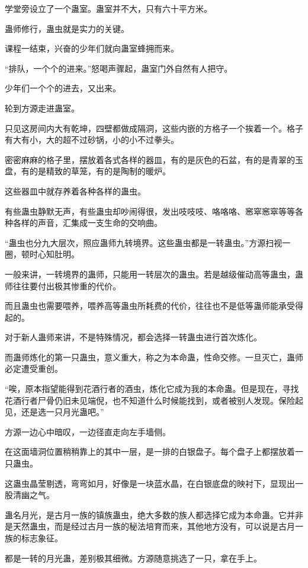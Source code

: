 
\begin{this_body}

学堂旁设立了一个蛊室。蛊室并不大，只有六十平方米。

蛊师修行，蛊虫就是实力的关键。

课程一结束，兴奋的少年们就向蛊室蜂拥而来。

“排队，一个个的进来。”怒喝声骤起，蛊室门外自然有人把守。

少年们一个个的进去，又出来。

轮到方源走进蛊室。

只见这房间内大有乾坤，四壁都做成隔洞，这些内嵌的方格子一个挨着一个。格子有大有小，大的超不过砂锅，小的小不过拳头。

密密麻麻的格子里，摆放着各式各样的器皿，有的是灰色的石盆，有的是青翠的玉盘，有的是精致的草笼，有的是陶制的暖炉。

这些器皿中就存养着各种各样的蛊虫。

有些蛊虫静默无声，有些蛊虫却吵闹得很，发出吱吱吱、咯咯咯、窸窣窸窣等等各种各样的声音，汇集成一支生命的交响曲。

“蛊虫也分九大层次，照应蛊师九转境界。这些蛊虫都是一转蛊虫。”方源扫视一圈，顿时心知肚明。

一般来讲，一转境界的蛊师，只能用一转层次的蛊虫。若是越级催动高等蛊虫，蛊师往往要付出极其惨重的代价。

而且蛊虫也需要喂养，喂养高等蛊虫所耗费的代价，往往也不是低等蛊师能承受得起的。

对于新人蛊师来讲，不是特殊情况，都会选择一转蛊虫进行首次炼化。

而蛊师炼化的第一只蛊虫，意义重大，称之为本命蛊，性命交修。一旦灭亡，蛊师必定遭受重创。

“唉，原本指望能得到花酒行者的酒虫，炼化它成为我的本命蛊。但是现在，寻找花酒行者尸骨仍旧未见端倪，也不知道什么时候能找到，或者被别人发现。保险起见，还是选一只月光蛊吧。”

方源一边心中暗叹，一边径直走向左手墙侧。

在这面墙洞位置稍稍靠上的其中一层，是一排的白银盘子。每个盘子上都摆放着一只蛊虫。

这蛊虫晶莹剔透，弯弯如月，好像是一块蓝水晶，在白银底盘的映衬下，显现出一股清幽之气。

蛊名月光，是古月一族的镇族蛊虫，绝大多数的族人都选择它成为本命蛊。它并非是天然蛊虫，而是经过古月一族的秘法培育而来，其他地方没有，可以说是古月一族的标志象征。

都是一转的月光蛊，差别极其细微。方源随意挑选了一只，拿在手上。


\end{this_body}
